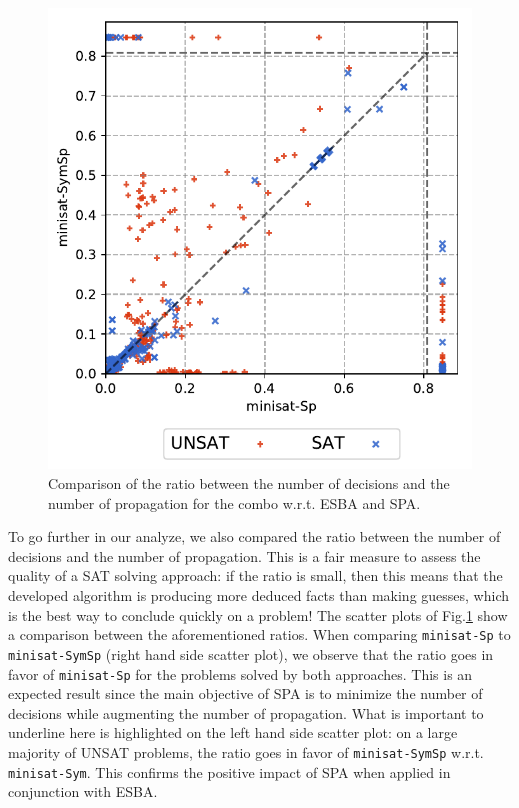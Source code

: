 \begin{center}
\begin{figure}[!htbp]
 \includegraphics[scale=0.5]{img/full-INFGB-ratio-vsspfs.pdf}
 \caption{Comparison of the ratio between the number of decisions and the number of propagation for the combo w.r.t. ESBA and SPA.}
 \label{fig:ratio}
\end{figure}
\end{center}

To go further in our analyze, we also compared the ratio between the number of
decisions and the number of propagation. This is a fair measure to assess the
quality of a SAT solving approach: if the ratio is small, then this means that
the developed algorithm is producing more deduced facts than making guesses,
which is the best way to conclude quickly on a problem!
The scatter plots of Fig.\ref{fig:ratio} show a comparison between the
aforementioned ratios. When comparing \texttt{minisat-Sp} to
\texttt{minisat-SymSp} (right hand side scatter plot), we observe that the
ratio goes in favor of \texttt{minisat-Sp} for the problems solved by both
approaches. This is an expected result since the main objective of SPA is to
minimize the number of decisions while augmenting the number of propagation.
What is important to underline here is highlighted on the left hand side
scatter plot: on a large majority of UNSAT problems, the ratio goes in favor
of \texttt{minisat-SymSp} w.r.t. \texttt{minisat-Sym}. This confirms the
positive impact of SPA when applied in conjunction with ESBA.


